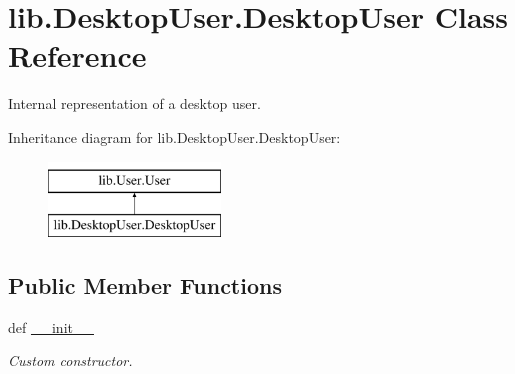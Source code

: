 \hypertarget{classlib_1_1DesktopUser_1_1DesktopUser}{\section{lib.\-Desktop\-User.\-Desktop\-User \-Class \-Reference}
\label{classlib_1_1DesktopUser_1_1DesktopUser}
}


\-Internal representation of a desktop user.  


\-Inheritance diagram for lib.\-Desktop\-User.\-Desktop\-User\-:\begin{figure}[H]
\begin{center}
\leavevmode
\includegraphics[height=2.000000cm]{classlib_1_1DesktopUser_1_1DesktopUser}
\end{center}
\end{figure}
\subsection*{\-Public \-Member \-Functions}
\begin{DoxyCompactItemize}
\item 
def \hyperlink{classlib_1_1DesktopUser_1_1DesktopUser_ae3bfb881da11b1fb564bbe934abbcd7a}{\-\_\-\-\_\-init\-\_\-\-\_\-}
\begin{DoxyCompactList}\small\item\em \-Custom constructor. \end{DoxyCompactList}\end{DoxyCompactItemize}
